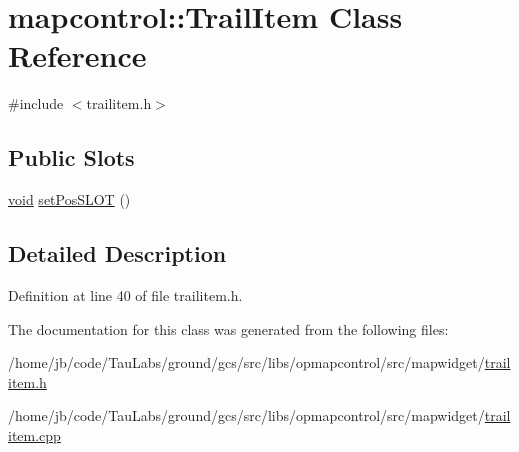 \hypertarget{classmapcontrol_1_1_trail_item}{\section{mapcontrol\-:\-:\-Trail\-Item \-Class \-Reference}
\label{classmapcontrol_1_1_trail_item}
}


{\ttfamily \#include $<$trailitem.\-h$>$}

\subsection*{\-Public \-Slots}
\begin{DoxyCompactItemize}
\item 
\hyperlink{group___u_a_v_objects_plugin_ga444cf2ff3f0ecbe028adce838d373f5c}{void} \hyperlink{group___o_p_map_widget_ga777b7b40dc91ba179a19cc547adeecab}{set\-Pos\-S\-L\-O\-T} ()
\end{DoxyCompactItemize}


\subsection{\-Detailed \-Description}


\-Definition at line 40 of file trailitem.\-h.



\-The documentation for this class was generated from the following files\-:\begin{DoxyCompactItemize}
\item 
/home/jb/code/\-Tau\-Labs/ground/gcs/src/libs/opmapcontrol/src/mapwidget/\hyperlink{trailitem_8h}{trailitem.\-h}\item 
/home/jb/code/\-Tau\-Labs/ground/gcs/src/libs/opmapcontrol/src/mapwidget/\hyperlink{trailitem_8cpp}{trailitem.\-cpp}\end{DoxyCompactItemize}
